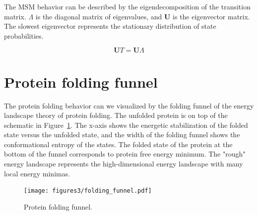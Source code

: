 The MSM behavior can be described by the eigendecomposition of the transition matrix. $\varLambda$ is the diagonal matrix of eigenvalues, and $\mathbf{U}$ is the eigenvector matrix. The slowest eigenvector represents the stationary distribution of state probabilities.

$$\mathbf{U}T=\mathbf{U}\varLambda$$


\section{Protein folding funnel}

The protein folding behavior can we visualized by the folding funnel of the energy landscape theory of protein folding\cite{bryngelson1995p}. The unfolded protein is on top of the schematic in Figure~\ref{fig:funnel}. The x-axis shows the energetic stabilization of the folded state versus the unfolded state, and the width of the folding funnel shows the conformational entropy of the states.  The folded state of the protein at the bottom of the funnel corresponds to protein free energy minimum. The "rough" energy landscape represents the high-dimensional energy landscape with many local energy minimas.

\begin{figure}[H]
  \centering
  \texttt{[image: figures3/folding\_funnel.pdf]}
  \caption{Protein folding funnel.}
  \label{fig:funnel}
\end{figure}



